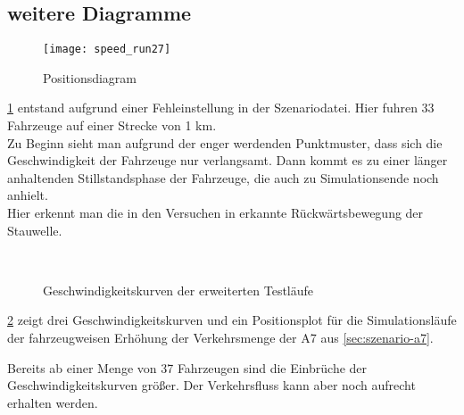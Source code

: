 \newpage

\subsection{weitere Diagramme}


\begin{figure}[hptb]
 \centering
 \texttt{[image: speed\_run27]}
 \caption[kurzText]
 		{Positionsdiagram}
 \label{figure:33veh-1km}
\end{figure}

\cref{figure:33veh-1km} entstand aufgrund einer Fehleinstellung in der Szenariodatei.
Hier fuhren 33 Fahrzeuge auf einer Strecke von 1 km.
\\
Zu Beginn sieht man aufgrund der enger werdenden Punktmuster, dass sich die Geschwindigkeit der Fahrzeuge nur verlangsamt. Dann kommt es zu einer länger anhaltenden Stillstandsphase der Fahrzeuge, die auch zu Simulationsende noch anhielt.
\\
Hier erkennt man die in den Versuchen in \cite{na-sch} erkannte Rückwärtsbewegung der Stauwelle.


\newpage


\begin{figure}[hptb]
  \centering
   \qquad 
   \qquad 
    \\
  \caption{Geschwindigkeitskurven der erweiterten Testläufe}
  \label{figure:short-a7}
\end{figure}

\cref{figure:short-a7} zeigt drei Geschwindigkeitskurven und ein Positionsplot für die Simulationsläufe der fahrzeugweisen Erhöhung der Verkehrsmenge der A7 aus \cref{sec:szenario-a7}.

Bereits ab einer Menge von 37 Fahrzeugen sind die Einbrüche der Geschwindigkeitskurven größer.
Der Verkehrsfluss kann aber noch aufrecht erhalten werden.

